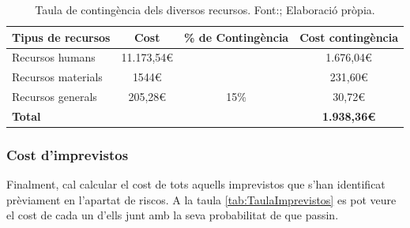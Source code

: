 \documentclass[a4paper]{article}
\begin{document}
\begin{table}[H]
    \begin{center}
        \begin{tabular}{|l|c|c|c|}
            \hline
            \rowcolor[HTML]{9B9B9B} 
            {\color[HTML]{000000} \textbf{Tipus de recursos}} & {\color[HTML]{000000} \textbf{Cost}} & {\color[HTML]{000000} \textbf{\% de Contingència}} & {\color[HTML]{000000} \textbf{Cost contingència}} \\ \hline
            {\color[HTML]{000000} Recursos humans}            & {\color[HTML]{000000} 11.173,54€}    & {\color[HTML]{000000} }                            & {\color[HTML]{000000} 1.676,04€}                  \\ \cline{1-2} \cline{4-4} 
            {\color[HTML]{000000} Recursos materials}         & {\color[HTML]{000000} 1544€}          & {\color[HTML]{000000} }                            & {\color[HTML]{000000} 231,60€}                    \\ \cline{1-2} \cline{4-4} 
            {\color[HTML]{000000} Recursos generals}          & {\color[HTML]{000000} 205,28€}       & \multirow{-3}{*}{{\color[HTML]{000000} 15\%}}      & {\color[HTML]{000000} 30,72€}                     \\ \hline
            \rowcolor[HTML]{C0C0C0} 
            {\color[HTML]{000000} \textbf{Total}}             & {\color[HTML]{000000} \textbf{}}     & {\color[HTML]{000000} \textbf{}}                   & {\color[HTML]{000000} \textbf{1.938,36€}}         \\ \hline
        \end{tabular}
        \caption[Taula de contingència dels diversos recursos]{Taula de contingència dels diversos recursos. Font:; Elaboració pròpia.}
        \label{tab:TaulaContingència}
    \end{center}
\end{table}

\subsubsection{Cost d'imprevistos}
Finalment, cal calcular el cost de tots aquells imprevistos que s'han identificat prèviament en l'apartat de riscos. A la taula \ref{tab:TaulaImprevistos} es pot veure el cost de cada un d'ells junt amb la seva probabilitat de que passin.
\end{document}
